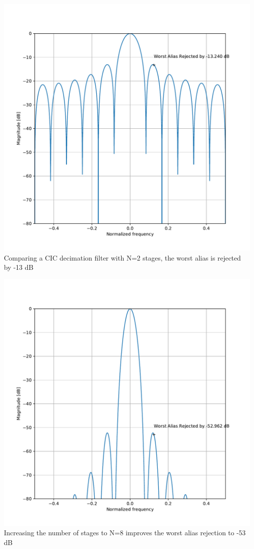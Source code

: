 \documentclass{article}
\begin{document}
\begin{center}
	\begin{minipage}{0.49\linewidth}
		\includegraphics[width=0.99\linewidth]{cic_r12_n2.pdf} \\
		Comparing a CIC decimation filter with N=2 stages,
		the worst alias is rejected by -13 dB
	\end{minipage}
	\begin{minipage}{0.49\linewidth}
		\includegraphics[width=0.99\linewidth]{cic_r12_n8.pdf} \\
		Increasing the number of stages to N=8
		improves the worst alias rejection to -53 dB
	\end{minipage}
\end{center}
\end{document}
